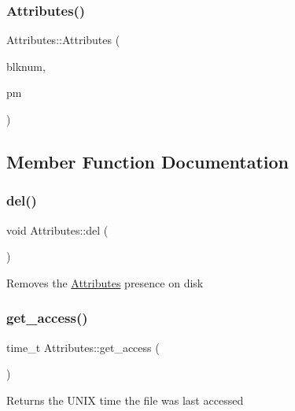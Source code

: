 \subsubsection{\texorpdfstring{Attributes()}{Attributes()}}
{\footnotesize\ttfamily Attributes\+::\+Attributes (\begin{DoxyParamCaption}\item[{Blk\+Num\+Type}]{blknum,  }\item[{\mbox{\hyperlink{class_partition_manager}{Partition\+Manager}} $\ast$}]{pm }\end{DoxyParamCaption})}



\subsection{Member Function Documentation}
\mbox{\label{class_attributes_acf28e724c914f066ecdae788d95b3212}} 
\subsubsection{\texorpdfstring{del()}{del()}}
{\footnotesize\ttfamily void Attributes\+::del (\begin{DoxyParamCaption}{ }\end{DoxyParamCaption})}

Removes the \mbox{\hyperlink{class_attributes}{Attributes}} presence on disk \mbox{\label{class_attributes_a9cd0c49733d3de43a8916a318ba62bc1}} 
\subsubsection{\texorpdfstring{get\+\_\+access()}{get\_access()}}
{\footnotesize\ttfamily time\+\_\+t Attributes\+::get\+\_\+access (\begin{DoxyParamCaption}{ }\end{DoxyParamCaption})}

\begin{DoxyReturn}{Returns}
the U\+N\+IX time the file was last accessed 
\end{DoxyReturn}
\mbox{\label{class_attributes_aeb0845464130e292875be4f8dcc51e8a}} 
